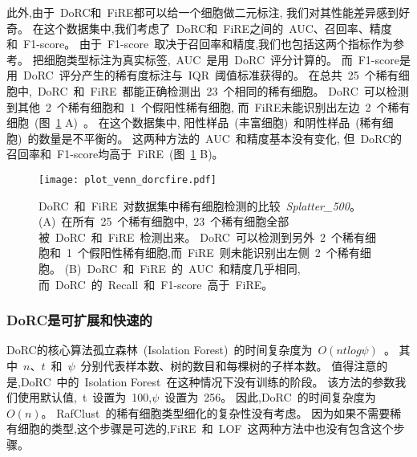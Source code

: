 此外,由于~DoRC和~FiRE都可以给一个细胞做二元标注,
我们对其性能差异感到好奇。
在这个数据集中,我们考虑了~DoRC和~FiRE之间的~AUC、召回率、精度和~F1-score。
由于~F1-score~取决于召回率和精度,我们也包括这两个指标作为参考。
把细胞类型标注为真实标签,~AUC~是用~DoRC~评分计算的。
而~F1-score是用~DoRC~评分产生的稀有度标注与~IQR~阈值标准获得的。
在总共~25~个稀有细胞中,~DoRC~和~FiRE~都能正确检测出~23~个相同的稀有细胞。
DoRC~可以检测到其他~2~个稀有细胞和~1~个假阳性稀有细胞,
而~FiRE未能识别出左边~2~个稀有细胞~(图~\ref{fig:simulate:venn_auc_f1} A)~。
在这个数据集中, 阳性样品~(丰富细胞)~和阴性样品~(稀有细胞)~的数量是不平衡的。
这两种方法的~AUC~和精度基本没有变化,
但~DoRC的召回率和~F1-score均高于~FiRE~(图~\ref{fig:simulate:venn_auc_f1} B)。
\begin{figure}[!htbp]
    \centering
    \texttt{[image: plot\_venn\_dorcfire.pdf]}
    \caption{
    DoRC~和~FiRE~对数据集中稀有细胞检测的比较~\textit{Splatter\_500}。
    (A)~在所有~25~个稀有细胞中,~23~个稀有细胞全部被~DoRC~和~FiRE~检测出来。
    DoRC~可以检测到另外~2~个稀有细胞和~1~个假阳性稀有细胞,而~FiRE~则未能识别出左侧~2~个稀有细胞。
    (B)~DoRC~和~FiRE~的~AUC~和精度几乎相同,而~DoRC~的~Recall~和~F1-score~高于~FiRE。
    }
    \label{fig:simulate:venn_auc_f1}
\end{figure}

\subsubsection{DoRC是可扩展和快速的}
\label{subsec:scalable} 
DoRC的核心算法孤立森林~(Isolation Forest)~的时间复杂度为~$O(ntlog\psi)$~\cite{liu2008isolation}。
其中~$n$、$t$~和~$\psi$~分别代表样本数、树的数目和每棵树的子样本数。
值得注意的是,DoRC~中的~Isolation Forest~在这种情况下没有训练的阶段。
该方法的参数我们使用默认值,~t~设置为~100,$\psi$~设置为~256。
因此,DoRC~的时间复杂度为~$O(n)$。
RafClust~的稀有细胞类型细化的复杂性没有考虑。
因为如果不需要稀有细胞的类型,这个步骤是可选的,FiRE~和~LOF~这两种方法中也没有包含这个步骤。

